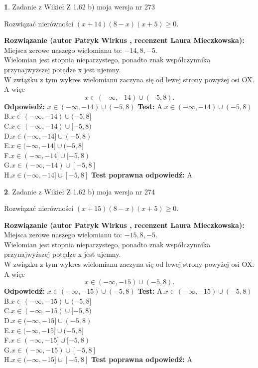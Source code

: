 \documentclass[12pt, a4paper]{article}
\theoremstyle{definition} %
\newtheorem{zad}{}
\newcommand{\zadStart}[1]{\begin{zad}#1\newline}
\newcommand{\zadStop}{\end{zad}}
\newcommand{\rozwStart}[2]{\noindent \textbf{Rozwiązanie (autor #1 , recenzent #2): }\newline}
\newcommand{\rozwStop}{\newline}
\newcommand{\odpStart}{\noindent \textbf{Odpowiedź:}\newline}
\newcommand{\odpStop}{\newline}
\newcommand{\testStart}{\noindent \textbf{Test:}\newline}
\newcommand{\testStop}{\newline}
\newcommand{\kluczStart}{\noindent \textbf{Test poprawna odpowiedź:}\newline}
\newcommand{\kluczStop}{\newline}
\begin{document}
\zadStart{Zadanie z Wikieł Z 1.62 b) moja wersja nr 273}

Rozwiązać nierówności $(x+14)(8-x)(x+5)\ge0$.
\zadStop
\rozwStart{Patryk Wirkus}{Laura Mieczkowska}
Miejsca zerowe naszego wielomianu to: $-14, 8, -5$.\\
Wielomian jest stopnia nieparzystego, ponadto znak współczynnika przy\linebreak najwyższej potędze x jest ujemny.\\ W związku z tym wykres wielomianu zaczyna się od lewej strony powyżej osi OX. A więc $$x \in (-\infty,-14) \cup (-5,8).$$
\rozwStop
\odpStart
$x \in (-\infty,-14) \cup (-5,8)$
\odpStop
\testStart
A.$x \in (-\infty,-14) \cup (-5,8)$\\
B.$x \in (-\infty,-14) \cup (-5,8]$\\
C.$x \in (-\infty,-14) \cup [-5,8)$\\
D.$x \in (-\infty,-14] \cup (-5,8)$\\
E.$x \in (-\infty,-14] \cup (-5,8]$\\
F.$x \in (-\infty,-14] \cup [-5,8)$\\
G.$x \in (-\infty,-14) \cup [-5,8]$\\
H.$x \in (-\infty,-14] \cup [-5,8]$
\testStop
\kluczStart
A
\kluczStop



\zadStart{Zadanie z Wikieł Z 1.62 b) moja wersja nr 274}

Rozwiązać nierówności $(x+15)(8-x)(x+5)\ge0$.
\zadStop
\rozwStart{Patryk Wirkus}{Laura Mieczkowska}
Miejsca zerowe naszego wielomianu to: $-15, 8, -5$.\\
Wielomian jest stopnia nieparzystego, ponadto znak współczynnika przy\linebreak najwyższej potędze x jest ujemny.\\ W związku z tym wykres wielomianu zaczyna się od lewej strony powyżej osi OX. A więc $$x \in (-\infty,-15) \cup (-5,8).$$
\rozwStop
\odpStart
$x \in (-\infty,-15) \cup (-5,8)$
\odpStop
\testStart
A.$x \in (-\infty,-15) \cup (-5,8)$\\
B.$x \in (-\infty,-15) \cup (-5,8]$\\
C.$x \in (-\infty,-15) \cup [-5,8)$\\
D.$x \in (-\infty,-15] \cup (-5,8)$\\
E.$x \in (-\infty,-15] \cup (-5,8]$\\
F.$x \in (-\infty,-15] \cup [-5,8)$\\
G.$x \in (-\infty,-15) \cup [-5,8]$\\
H.$x \in (-\infty,-15] \cup [-5,8]$
\testStop
\kluczStart
A
\kluczStop
\end{document}
